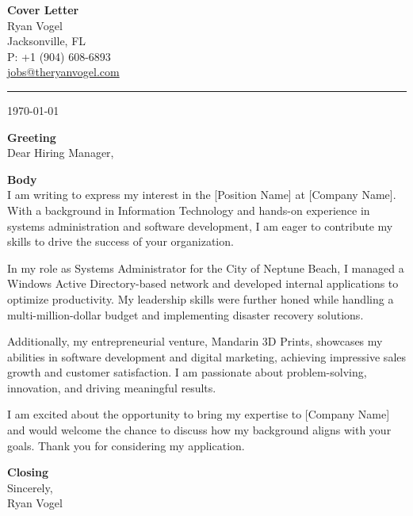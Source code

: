 \documentclass[a4paper,10pt]{article}
\newcommand{\sectiontitle}[1]{
  \vspace{0.4cm}
  \textbf{#1} \\
}
\begin{document}
\begin{center}
  \textbf{\Large Cover Letter} \\
  Ryan Vogel \\ Jacksonville, FL \\
  P: +1 (904) 608-6893 \\
  \href{mailto:jobs@theryanvogel.com}{jobs@theryanvogel.com} \\
\end{center}

\vspace{0.5cm}
\hrule
\vspace{0.4cm}

\today

\sectiontitle{Greeting}
Dear Hiring Manager,

\sectiontitle{Body}
I am writing to express my interest in the [Position Name] at [Company Name]. With a background in Information Technology and hands-on experience in systems administration and software development, I am eager to contribute my skills to drive the success of your organization.

In my role as Systems Administrator for the City of Neptune Beach, I managed a Windows Active Directory-based network and developed internal applications to optimize productivity. My leadership skills were further honed while handling a multi-million-dollar budget and implementing disaster recovery solutions.

Additionally, my entrepreneurial venture, Mandarin 3D Prints, showcases my abilities in software development and digital marketing, achieving impressive sales growth and customer satisfaction. I am passionate about problem-solving, innovation, and driving meaningful results.

I am excited about the opportunity to bring my expertise to [Company Name] and would welcome the chance to discuss how my background aligns with your goals. Thank you for considering my application.

\sectiontitle{Closing}
Sincerely, \\
Ryan Vogel
\end{document}
